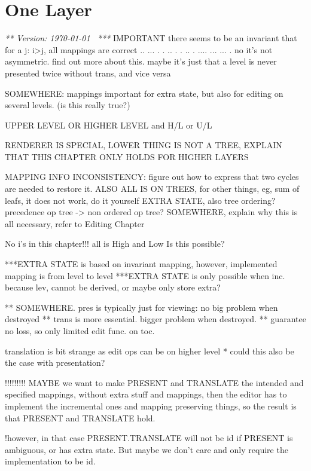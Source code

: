 \chapter{One Layer}
\label{chap:singleLayer}

{\em *** Version: \today~ ***}
\bc
IMPORTANT there seems to be an invariant that for a j:  i>j, all mappings are correct 
  ..           ...       
 .  .    ..   .   .   .. 
.    ....  ...     ...  .
 no it's not asymmetric. find out more about this.
 maybe it's just that a level is never presented twice without trans, and vice versa

SOMEWHERE: mappings important for extra state, but also for editing on several levels. (is this really true?)

UPPER LEVEL OR HIGHER LEVEL  and H/L or U/L

RENDERER IS SPECIAL, LOWER THING IS NOT A TREE, EXPLAIN THAT THIS CHAPTER ONLY HOLDS FOR HIGHER LAYERS

MAPPING INFO INCONSISTENCY: figure out how to express that two cycles are needed to restore it.
ALSO ALL IS ON TREES, for other things, eg, sum of leafs, it does not work, do it yourself
EXTRA STATE, also tree ordering? precedence op tree -> non ordered op tree?
SOMEWHERE, explain why this is all necessary, refer to Editing Chapter

No i's in this chapter!!! all is High and Low Is this possible?

***EXTRA STATE is based on invariant mapping, however, implemented mapping is from level to level
***EXTRA STATE is only possible when inc. because lev, cannot be derived, or maybe only store extra?

** SOMEWHERE. pres is typically just for viewing: no big problem when destroyed
** trans is more essential. bigger problem when destroyed.
** guarantee no loss, so only limited edit func. on toc.

translation is bit strange as edit ops can be on higher level
* could this also be the case with presentation?



!!!!!!!!!
MAYBE we want to make PRESENT and TRANSLATE the intended and specified mappings, 
without extra stuff and mappings, then the editor has to implement the incremental ones
 and mapping preserving things, so the result is that PRESENT and TRANSLATE hold.

!however, in that case PRESENT.TRANSLATE will not be id if PRESENT is ambiguous, or 
has extra state. But maybe we don't care and only require the implementation to be id.

